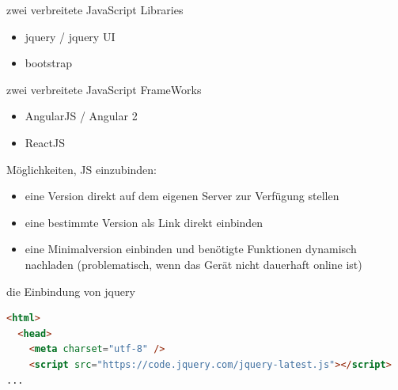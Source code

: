 \begin{frame}{zwei verbreitete JavaScript Libraries}
  \begin{itemize}
    \item jquery / jquery UI
    \item bootstrap
  \end{itemize}
\end{frame}

\begin{frame}{zwei verbreitete JavaScript FrameWorks}
  \begin{itemize}
    \item AngularJS / Angular 2
    \item ReactJS
  \end{itemize}
\end{frame}


\begin{frame}{Möglichkeiten, JS einzubinden:}
  \begin{itemize}
    \item eine Version direkt auf dem eigenen Server zur Verfügung stellen
    \item eine bestimmte Version als Link direkt einbinden
    \item eine Minimalversion einbinden und benötigte Funktionen dynamisch nachladen (problematisch, wenn das Gerät nicht dauerhaft online ist)
  \end{itemize}
\end{frame}


\begin{frame}[fragile]{die Einbindung von jquery}
  \selectfont
  \begin{lstlisting}[language=html]
<html>
  <head>
    <meta charset="utf-8" />
    <script src="https://code.jquery.com/jquery-latest.js"></script>
...
  \end{lstlisting}
\end{frame}

